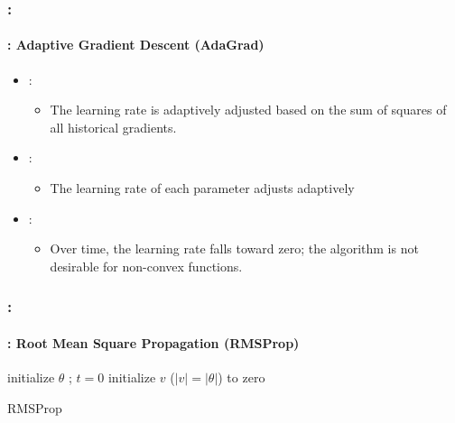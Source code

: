 \documentclass[xcolor=table]{beamer}
\begin{document}
\begin{frame}
	\frametitle{\insertshortsubtitle: \insertsection}
	\framesubtitle{\insertsubsection: Adaptive Gradient Descent (AdaGrad)}
	
	\begin{itemize}
		\item {}:
		\begin{itemize}
			\item The learning rate is adaptively adjusted based on the sum of squares of all historical gradients.
		\end{itemize}
		\item {}:
		\begin{itemize}
			\item The learning rate of each parameter adjusts adaptively
		\end{itemize}
		\item {}:
		\begin{itemize}
			\item Over time, the learning rate falls toward zero; the algorithm is not desirable for non-convex functions.
		\end{itemize}
	\end{itemize}

\end{frame}

\begin{frame}
	\frametitle{\insertshortsubtitle: \insertsection}
	\framesubtitle{\insertsubsection: Root Mean Square Propagation (RMSProp)}
	
	\begin{algorithm}[H]
		\KwResult{$ \theta $}
		initialize $ \theta $ ; $ t = 0 $\;
		initialize $v$ ($|v| = |\theta|$) to zero\;
		\caption{RMSProp \cite{2014-hinton-al}}
	\end{algorithm}

\end{frame}
\end{document}
